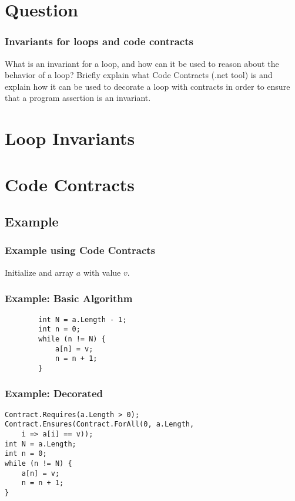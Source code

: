 
\section{Question}

\begin{frame}
    \frametitle{Invariants for loops and code contracts}

    What is an invariant for a loop, and how can it be used to reason about the
    behavior of a loop? Briefly explain what Code Contracts (.net tool) is and
    explain how it can be used to decorate a loop with contracts in order to
    ensure that a program assertion is an invariant.
\end{frame}

\section{Loop Invariants}



\section{Code Contracts}



\subsection{Example}

\begin{frame}
    \frametitle{Example using Code Contracts}
    Initialize and array $a$ with value $v$.
\end{frame}

\begin{frame}[fragile]
    \frametitle{Example: Basic Algorithm}
    \begin{verbatim}
        int N = a.Length - 1;
        int n = 0;
        while (n != N) {
            a[n] = v;
            n = n + 1;
        }
    \end{verbatim}
\end{frame}

\begin{frame}[fragile]
    \frametitle{Example: Decorated}
    \begin{verbatim}
Contract.Requires(a.Length > 0);
Contract.Ensures(Contract.ForAll(0, a.Length, 
    i => a[i] == v));
int N = a.Length;
int n = 0;
while (n != N) {
    a[n] = v;
    n = n + 1;
}
    \end{verbatim}
\end{frame}

